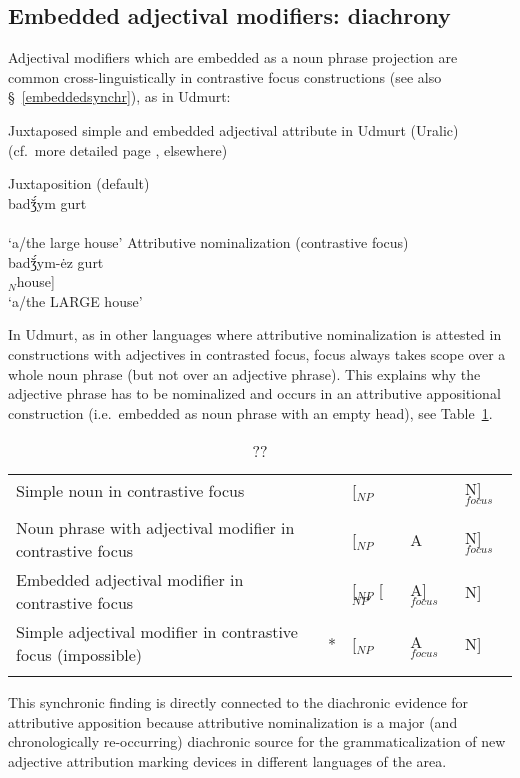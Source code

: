 \subsection{Embedded adjectival modifiers: diachrony}\label{embeddeddiachr}
Adjectival modifiers which are embedded as a noun phrase projection are common cross-linguistically in contrastive focus constructions (see also \S~\ref{embeddedsynchr}), as in Udmurt:
\begin{exe}
\ex \rm{Juxtaposed simple and embedded adjectival attribute in Udmurt (Uralic)}\\(cf.~more detailed page \pageref{udmurt synchr}, elsewhere)
\begin{xlist}
\ex	\rm{Juxtaposition (default)}\\
\gll	{}		badǯ́ym gurt\\
	[$_{NP}$ $_{A}$big $_{N}$house]\\
\glt	‘a/the large house’
\ex	\rm{Attributive nominalization (contrastive focus)}\\
\gll	{}		{}			badǯ́ym-ėz gurt\\
	[$_{NP}$ [$_{NP'}$ $_{A}$big-\textsc{nmlz}] $_{N}$house]\\
\glt	‘a/the LARGE house’
\end{xlist}
\end{exe}
In Udmurt, as in other languages where attributive nominalization is attested in constructions with adjectives in contrasted focus, focus always takes scope over a whole noun phrase (but not over an adjective phrase). This explains why the adjective phrase has to be nominalized and occurs in an attributive appositional construction (i.e.~embedded as noun phrase with an empty head), see Table~\ref{udm-nom}.
\begin{table}
\begin{tabularx}{\textwidth}{X r l l l}
\lsptoprule
Simple noun in contrastive focus					&	&[$_{NP}$ 		&			&N]$_{focus}$\\
\\
\midrule
Noun phrase with adjectival modifier in contrastive focus	&	&[$_{NP}$ 		&A 			&N]$_{focus}$\\
\midrule
Embedded adjectival modifier in contrastive focus		&	&[$_{NP}$ [$_{NP'}$ &A]$_{focus}$ 	&N]\\
\midrule
Simple adjectival modifier in contrastive focus (impossible)&{*}	&[$_{NP}$ 		&A$_{focus}$ 	&N]\\
\lspbottomrule
\end{tabularx}
\caption[??]{??}\label{udm-nom}
\end{table}
This synchronic finding is directly connected to the diachronic evidence for attributive apposition because attributive nominalization is a major (and chronologically re-occurring) diachronic source for the grammaticalization of new adjective attribution marking devices in different languages of the area.

